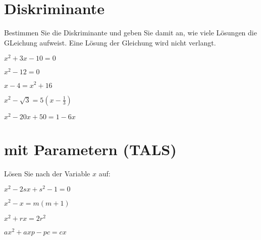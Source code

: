 \section{Diskriminante}
Bestimmen Sie die Diskriminante und geben Sie damit an, wie viele
Lösungen die GLeichung aufweist. Eine Lösung der Gleichung wird nicht
verlangt.


\begin{bbwAufgabenBlock}
\item $ x^2 + 3x - 10= 0$

\item $ x^2 - 12= 0$

\item $ x-4= x^2 + 16$

\item $ x^2 - \sqrt{3} = 5(x-\frac13)$

\item $ x^2 - 20x + 50 = 1 - 6x$




\end{bbwAufgabenBlock}
\newpage



\section{mit Parametern (TALS)}
Lösen Sie nach der Variable $x$ auf:

\begin{bbwAufgabenBlock}
\item $ x^2 - 2sx + s^2 -1 = 0$

\item $ x^2 - x= m(m+1)$

\item $ x^2 + rx = 2r^2 $

\item $ ax^2 + axp - pc = cx$


\end{bbwAufgabenBlock}
\newpage
